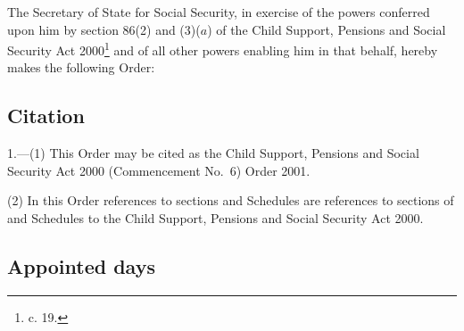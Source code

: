 \documentclass[12pt,a4paper]{article}
\title{\regstitle}
\author{S.I. 2001 No. 153 (C.8)}
\date{Made 24th January 2001%
}
\begin{document}
\maketitle

\noindent
The Secretary of State for Social Security, in exercise of the powers conferred upon him by section 86(2) and (3)($a$) of the Child Support, Pensions and Social Security Act 2000\footnote{ c. 19.} and of all other powers enabling him in that behalf, hereby makes the following Order: 

{\sloppy

\tableofcontents

}

\bigskip

\setcounter{secnumdepth}{-2}

\subsection[1. Citation]{Citation}

1.---(1)  This Order may be cited as the Child Support, Pensions and Social Security Act 2000 (Commencement No.\ 6) Order 2001.

(2) In this Order references to sections and Schedules are references to sections of and Schedules to the Child Support, Pensions and Social Security Act 2000.

\subsection[2. Appointed days]{Appointed days}
\end{document}

